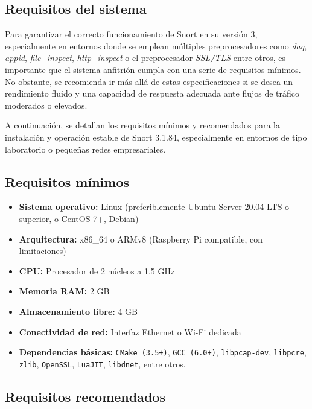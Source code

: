 \documentclass[11pt,a4paper,twoside]{report}
\begin{document}
\subsection{Requisitos del sistema}

Para garantizar el correcto funcionamiento de Snort en su versión 3, especialmente en entornos donde se emplean múltiples preprocesadores como \textit{daq}, \textit{appid}, \textit{file\_inspect}, \textit{http\_inspect} o el preprocesador \textit{SSL/TLS} entre otros, es importante que el sistema anfitrión cumpla con una serie de requisitos mínimos. No obstante, se recomienda ir más allá de estas especificaciones si se desea un rendimiento fluido y una capacidad de respuesta adecuada ante flujos de tráfico moderados o elevados.\newline

A continuación, se detallan los requisitos mínimos y recomendados para la instalación y operación estable de Snort 3.1.84, especialmente en entornos de tipo laboratorio o pequeñas redes empresariales.

\subsection*{Requisitos mínimos}

\begin{itemize}
	\item \textbf{Sistema operativo:} Linux (preferiblemente Ubuntu Server 20.04 LTS o superior, o CentOS 7+, Debian)
	\item \textbf{Arquitectura:} x86\_64 o ARMv8 (Raspberry Pi compatible, con limitaciones)
	\item \textbf{CPU:} Procesador de 2 núcleos a 1.5 GHz
	\item \textbf{Memoria RAM:} 2 GB
	\item \textbf{Almacenamiento libre:} 4 GB
	\item \textbf{Conectividad de red:} Interfaz Ethernet o Wi-Fi dedicada
	\item \textbf{Dependencias básicas:} \texttt{CMake (3.5+)}, \texttt{GCC (6.0+)}, \texttt{libpcap-dev}, \texttt{libpcre}, \texttt{zlib}, \texttt{OpenSSL}, \texttt{LuaJIT}, \texttt{libdnet}, entre otros.
\end{itemize}

\subsection*{Requisitos recomendados}
\end{document}

